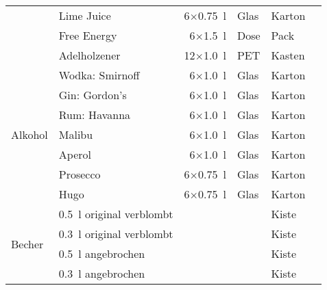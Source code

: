 {{\begin{center}
\begin{tabular}{|p{2cm}|lrll|l|}
            & Lime Juice      & 6$\times$\SI{0.75}{\litre}  & Glas & Karton &  \\
            & Free Energy     & 6$\times$\SI{1.5}{\litre}   & Dose & Pack   &  \\
            & Adelholzener    & 12$\times$\SI{1.0}{\litre}  & PET  & Kasten &  \\
            \hline
            \multirow{7}{*}{Alkohol}
            & Wodka: Smirnoff & 6$\times$\SI{1.0}{\litre}   & Glas & Karton &  \\
            & Gin: Gordon's   & 6$\times$\SI{1.0}{\litre}   & Glas & Karton &  \\
            & Rum: Havanna    & 6$\times$\SI{1.0}{\litre}   & Glas & Karton &  \\
            & Malibu          & 6$\times$\SI{1.0}{\litre}   & Glas & Karton &  \\
            & Aperol          & 6$\times$\SI{1.0}{\litre}   & Glas & Karton &  \\
            & Prosecco        & 6$\times$\SI{0.75}{\litre}  & Glas & Karton &  \\
            & Hugo            & 6$\times$\SI{0.75}{\litre}  & Glas & Karton &  \\
            \hline
            \multirow{4}{*}{Becher}
            & \SI{0.5}{\litre} original verblombt &                            &      & Kiste  &  \\
            & \SI{0.3}{\litre} original verblombt &                            &      & Kiste  &  \\
            & \SI{0.5}{\litre} angebrochen &                            &      & Kiste  &  \\
            & \SI{0.3}{\litre} angebrochen &                            &      & Kiste  &  \\ \hline
        \end{tabular}
    \end{center}
}
}
